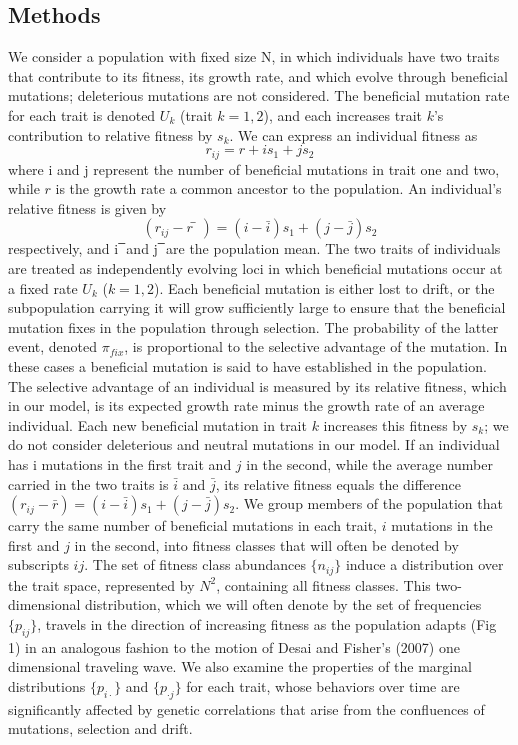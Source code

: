 \documentclass[11pt,one column]{article}
\begin{document}
\begin{multicols}{2}
\section*{Methods}
We consider a population with fixed size N, in which individuals have two traits that contribute to its fitness, its growth rate, and which evolve through beneficial mutations; deleterious mutations are not considered.  The beneficial mutation rate for each trait is denoted $U_k$ (trait $k=1,2$), and each increases trait $k$’s contribution to relative fitness by $s_k$.  We can express an individual fitness as 
\[ r_{ij}=r+i s_1+j s_2 \]
where i and j represent the number of beneficial mutations in trait one and two, while $r$ is the growth rate a common ancestor to the population. 
An individual’s relative fitness is given by
\[ (r_{ij}-r ̅)=(i-\bar{i} ) s_1+(j-\bar{j} ) s_2 \]
respectively, and i ̅ and j ̅ are the population mean.  The two traits of individuals are treated as independently evolving loci in which beneficial mutations occur at a fixed rate $U_k$ ($k=1,2$).  Each beneficial mutation is either lost to drift, or the subpopulation carrying it will grow sufficiently large to ensure that the beneficial mutation fixes in the population through selection. The probability of the latter event, denoted $\pi_{fix}$, is proportional to the selective advantage of the mutation. In these cases a beneficial mutation is said to have established in the population. The selective advantage of an individual is measured by its relative fitness, which in our model, is its expected growth rate minus the growth rate of an average individual. Each new beneficial mutation in trait $k$ increases this fitness by $s_k$; we do not consider deleterious and neutral mutations in our model. If an individual has i mutations in the first trait and $j$ in the second, while the average number carried in the two traits is $\bar{i}$ and $\bar{j}$, its relative fitness equals the difference $(r_{ij}-\bar{r})=(i-\bar{i}) s_1+(j-\bar{j}) s_2$. We group members of the population that carry the same number of beneficial mutations in each trait, $i$ mutations in the first and $j$ in the second, into fitness classes that will often be denoted by subscripts $ij$. The set of fitness class abundances $\{n_{ij} \}$ induce a distribution over the trait space, represented by $N^2$, containing all fitness classes. This two-dimensional distribution, which we will often denote by the set of frequencies $\{p_{ij}\}$, travels in the direction of increasing fitness as the population adapts (Fig 1) in an analogous fashion to the motion of Desai and Fisher’s (2007) one dimensional traveling wave. We also examine the properties of the marginal distributions $\{p_{i\cdot}\}$ and $\{p_{\cdot j}\}$ for each trait, whose behaviors over time are significantly affected by genetic correlations that arise from the confluences of mutations, selection and drift.

\end{multicols}
\end{document}
